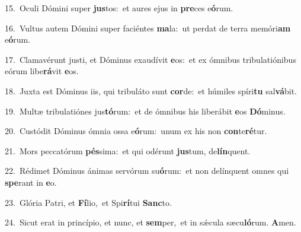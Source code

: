 {\numbfont\textcolor{\numbcolor}{15.}}~Oculi Dómini super \textbf{jus}\-tos:~\star et aures ejus in \textbf{pre}\-ces e\-\textbf{ó}\-rum.\par
{\numbfont\textcolor{\numbcolor}{16.}}~Vultus autem Dómini super faciéntes \textbf{ma}\-la:~\star ut perdat de terra memóri\textbf{am} e\-\textbf{ó}\-rum.\par
{\numbfont\textcolor{\numbcolor}{17.}}~Clamavérunt justi, et Dóminus exaudívit \textbf{e}\-os:~\star et ex ómnibus tribulatiónibus eórum libe\-\textbf{rá}\-vit \textbf{e}\-os.\par
{\numbfont\textcolor{\numbcolor}{18.}}~Juxta est Dóminus iis, qui tribuláto sunt \textbf{cor}\-de:~\star et húmiles spíri\textbf{tu} sal\-\textbf{vá}\-bit.\par
{\numbfont\textcolor{\numbcolor}{19.}}~Multæ tribulatiónes jus\-\textbf{tó}\-rum:~\star et de ómnibus his liberábit \textbf{e}\-os \textbf{Dó}\-minus.\par
{\numbfont\textcolor{\numbcolor}{20.}}~Custódit Dóminus ómnia ossa e\-\textbf{ó}\-rum:~\star unum ex his non \textbf{con}\-te\-\textbf{ré}\-tur.\par
{\numbfont\textcolor{\numbcolor}{21.}}~Mors peccatórum \textbf{pés}\-sima:~\star et qui odérunt \textbf{jus}\-tum, de\-\textbf{lín}\-quent.\par
{\numbfont\textcolor{\numbcolor}{22.}}~Rédimet Dóminus ánimas servórum su\-\textbf{ó}\-rum:~\star et non delínquent omnes qui \textbf{spe}\-rant in \textbf{e}\-o.\par
{\numbfont\textcolor{\numbcolor}{23.}}~Glória Patri, et \textbf{Fí}\-lio,~\star et Spi\-\textbf{rí}\-tui \textbf{Sanc}\-to.\par
{\numbfont\textcolor{\numbcolor}{24.}}~Sicut erat in princípio, et nunc, et \textbf{sem}\-per,~\star et in sǽcula sæcu\-\textbf{ló}\-rum. \textbf{A}\-men.\par
